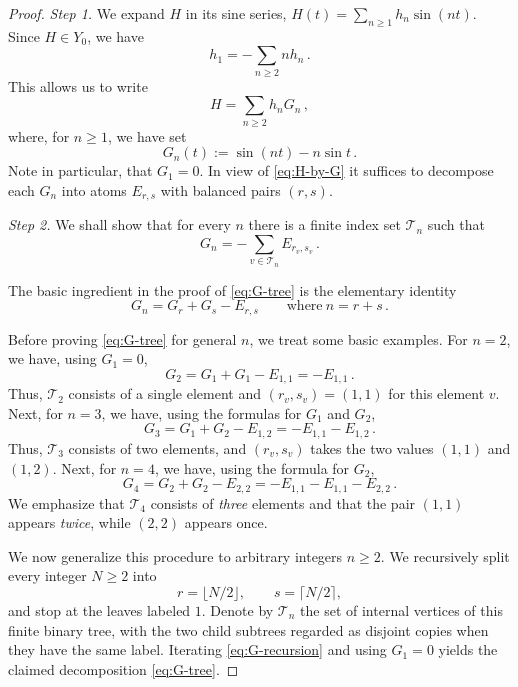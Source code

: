 \documentclass[11pt]{amsart}
\theoremstyle{definition}
\theoremstyle{remark}
\begin{document}
\begin{proof}
\emph{Step 1.} We expand $H$ in its sine series, $H(t)=\sum_{n\geq1}h_n\sin(nt)$. Since $H\in Y_0$, we have
\[
 h_1=-\sum_{n\geq2}nh_n \,.
\]
This allows us to write
\begin{equation}\label{eq:H-by-G}
 H=\sum_{n\geq2}h_nG_n \,,
\end{equation}
where, for $n\geq1$, we have set
\[
 G_n(t):=\sin(nt)-n\sin t \,.
\]
Note in particular, that $G_1=0$. In view of \eqref{eq:H-by-G} it suffices to decompose each $G_n$ into atoms $E_{r,s}$ with balanced pairs $(r,s)$.

\medskip

\emph{Step 2.} We shall show that for every $n$ there is a finite index set $\mathcal T_n$ such that
\begin{equation}\label{eq:G-tree}
    G_n=-\sum_{v\in\mathcal T_n}E_{r_v,s_v} \,.
\end{equation}

The basic ingredient in the proof of \eqref{eq:G-tree} is the elementary identity
\begin{equation}\label{eq:G-recursion}
 G_n=G_r+G_s-E_{r,s}
 \qquad\text{where}\ n= r+s \,.
\end{equation}

Before proving \eqref{eq:G-tree} for general $n$, we treat some basic examples. For $n=2$, we have, using $G_1=0$,
$$
G_2 = G_1 + G_1 - E_{1,1} = - E_{1,1} \,.
$$
Thus, $\mathcal T_2$ consists of a single element and $(r_v,s_v)=(1,1)$ for this element $v$. Next, for $n=3$, we have, using the formulas for $G_1$ and $G_2$, 
$$
G_3 = G_1 + G_2 - E_{1,2} = - E_{1,1} - E_{1,2} \,.
$$
Thus, $\mathcal T_3$ consists of two elements, and $(r_v,s_v)$ takes the two values $(1,1)$ and $(1,2)$. Next, for $n=4$, we have, using the formula for $G_2$,
$$
G_4 = G_2 + G_2 - E_{2,2} = - E_{1,1} - E_{1,1} - E_{2,2} \,.
$$
We emphasize that $\mathcal T_4$ consists of \emph{three} elements and that the pair $(1,1)$ appears \emph{twice}, while $(2,2)$ appears once.

We now generalize this procedure to arbitrary integers $n\geq 2$. We recursively split every integer $N\geq2$ into
\[
 r=\lfloor N/2\rfloor,
 \qquad
 s=\lceil N/2\rceil,
\]
and stop at the leaves labeled $1$.  Denote by $\mathcal T_n$ the set of internal vertices of this finite binary tree, with the two child subtrees regarded as disjoint copies when they have the same label.  Iterating \eqref{eq:G-recursion} and using $G_1=0$ yields the claimed decomposition \eqref{eq:G-tree}.


\end{proof}
\end{document}

